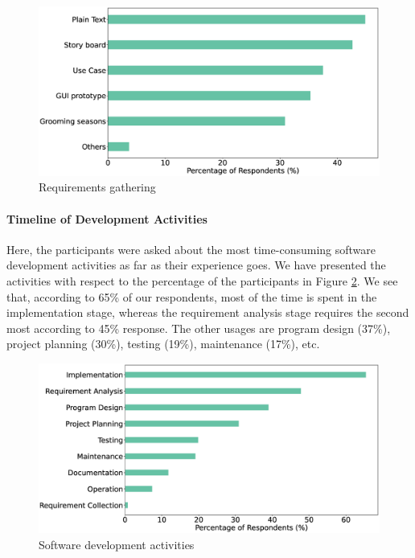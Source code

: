 \begin{figure}[h]
\centering
  \includegraphics[scale=0.18]{Figures/Requirements_Gathering}
  \caption{Requirements gathering}
  \label{fig:requirements}
\end{figure}


\paragraph{Timeline of Development Activities}
Here, the participants were asked about the most time-consuming software development activities as far as their experience goes. We have presented the activities with respect to the percentage of the participants in Figure \ref{fig:activities}. We see that, according to 65\% of our respondents, most of the time is spent in the implementation stage, whereas the requirement analysis stage requires the second most according to 45\% response. The other usages are program design (37\%), project planning (30\%), testing (19\%), maintenance (17\%), etc.

\begin{figure}[h]
\centering
  \includegraphics[scale=0.2]{Figures/Respondents_Activities}
  \caption{Software development activities}
  \label{fig:activities}
\end{figure}

